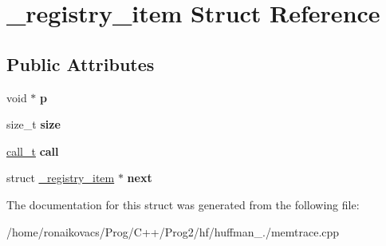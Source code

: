 \hypertarget{struct__registry__item}{}\section{\+\_\+registry\+\_\+item Struct Reference}
\label{struct__registry__item}
\subsection*{Public Attributes}
\begin{DoxyCompactItemize}
\item 
\mbox{\label{struct__registry__item_a7d2b50523d8801a40d30e17bfab37149}} 
void $\ast$ {\bfseries p}
\item 
\mbox{\label{struct__registry__item_a98122f145c9d8ef6b8e34c534307423d}} 
size\+\_\+t {\bfseries size}
\item 
\mbox{\label{struct__registry__item_ae5167771e18dc20df38808a4dafa761f}} 
\hyperlink{structcall__t}{call\+\_\+t} {\bfseries call}
\item 
\mbox{\label{struct__registry__item_aa659ff3f2fa74b37e31b0bd3948bbf7f}} 
struct \hyperlink{struct__registry__item}{\+\_\+registry\+\_\+item} $\ast$ {\bfseries next}
\end{DoxyCompactItemize}


The documentation for this struct was generated from the following file\+:\begin{DoxyCompactItemize}
\item 
/home/ronaikovacs/\+Prog/\+C++/\+Prog2/hf/huffman\+\_./memtrace.\+cpp\end{DoxyCompactItemize}

